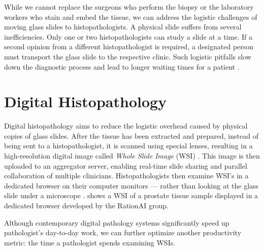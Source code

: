 While we cannot replace the surgeons who perform the biopsy or the laboratory workers who stain and embed the tissue, we can address the logistic challenges of moving glass slides to histopathologists.
A physical slide suffers from several inefficiencies. 
Only one or two histopathologists can study a slide at a time. If a second opinion from a different histopathologist is required, a designated person must transport the glass slide to the respective clinic.
Such logistic pitfalls slow down the diagnostic process and lead to longer waiting times for a patient \cite{from-traditional-to-digital-histopathology}.

\section{Digital Histopathology}

Digital histopathology aims to reduce the logistic overhead caused by physical copies of glass slides.
After the tissue has been extracted and prepared, instead of being sent to a histopathologist, it is scanned using special lenses, resulting in a high-resolution digital image called \emph{Whole Slide Image} (WSI) \cite{from-traditional-to-digital-histopathology}.
This image is then uploaded to an aggregator server, enabling real-time slide sharing and parallel collaboration of multiple clinicians.
Histopathologists then examine WSI's in a dedicated browser on their computer monitors --- rather than looking at the glass slide under a microscope \cite{digital-histopathology-process}.  shows a WSI of a prostate tissue sample displayed in a dedicated browser developed by the RationAI group.

Although contemporary digital pathology systems significantly speed up pathologist's day-to-day work, we can further optimize another productivity metric: the time a pathologist spends examining WSIs.

